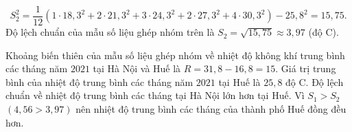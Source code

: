 \begin{ex}
{\begin{itemize}
\begin{itemize}
				$$ S_2^2 = \dfrac{1}{12}\left(1 \cdot 18{,}3^2 + 2 \cdot 21{,}3^2 + 3 \cdot 24{,}3^2 + 2 \cdot 27{,}3^2 + 4 \cdot 30{,}3^2\right) - 25{,}8^2 = 15{,}75. $$
				Độ lệch chuẩn của mẫu số liệu ghép nhóm trên là $S_2 = \sqrt{15{,}75} \approx 3{,}97$ (độ C).
			\end{itemize}
		\end{itemize}
		\begin{itemchoice}
			\itemch Khoảng biến thiên của mẫu số liệu ghép nhóm về nhiệt độ không khí trung bình các tháng năm $2021$ tại Hà Nội và Huế là $R = 31{,}8 - 16{,}8 = 15$.
			\itemch Giá trị trung bình của nhiệt độ trung bình các tháng năm $2021$ tại Huế là $25{,}8$ độ C.
			\itemch Độ lệch chuẩn về nhiệt độ trung bình các tháng tại Hà Nội lớn hơn tại Huế.
			\itemch Vì $S_1 > S_2$ $(4{,}56 > 3{,}97)$ nên nhiệt độ trung bình các tháng của thành phố Huế đồng đều hơn.
		\end{itemchoice}
	}
\end{ex}

